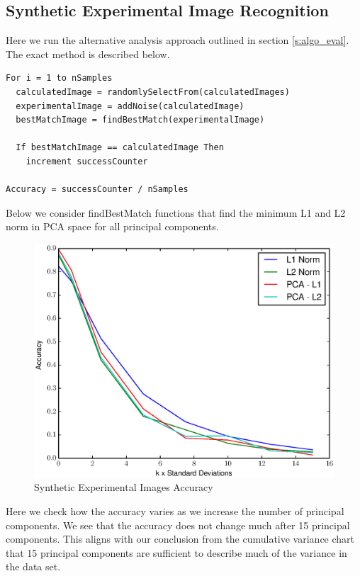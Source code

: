 \documentclass[12pt,letterpaper]{article}
\begin{document}

\clearpage

\subsection{Synthetic Experimental Image Recognition}
Here we run the alternative analysis approach outlined in section
\ref{s:algo_eval}. The exact method is described below.

\begin{verbatim}
For i = 1 to nSamples
  calculatedImage = randomlySelectFrom(calculatedImages)
  experimentalImage = addNoise(calculatedImage)
  bestMatchImage = findBestMatch(experimentalImage)

  If bestMatchImage == calculatedImage Then
    increment successCounter

Accuracy = successCounter / nSamples
\end{verbatim}

Below we consider findBestMatch functions that find the minimum L1 and L2 norm
in PCA space for all principal components.

\begin{figure}[ht]
  \begin{center}
    \includegraphics[scale=0.8]{figs/PCAAccuracyVsLpNorms.eps}
    \caption{Synthetic Experimental Images Accuracy}
  \end{center}
\end{figure}

Here we check how the accuracy varies as we increase the number of principal
components. We see that the accuracy does not change much after 15
principal components. This aligns with our conclusion from the cumulative
variance chart that 15 principal components are sufficient to describe much of
the variance in the data set.
\end{document}
